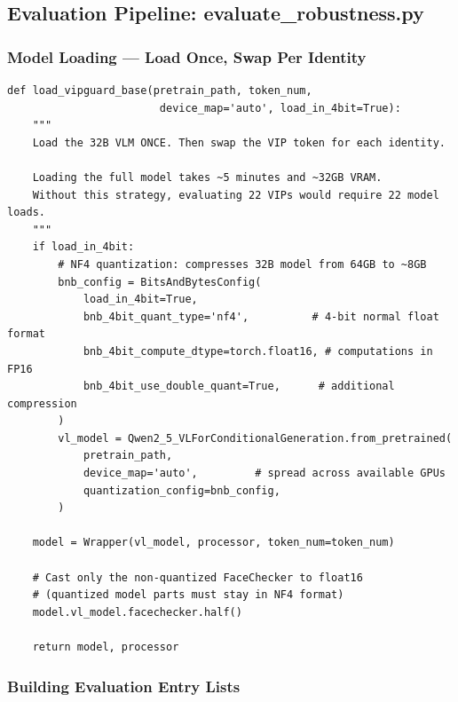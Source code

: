 \documentclass[12pt,a4paper]{article}
\begin{document}
\subsection{Evaluation Pipeline: evaluate\_robustness.py}

\subsubsection{Model Loading --- Load Once, Swap Per Identity}

\begin{lstlisting}[caption={evaluate\_robustness.py -- Efficient model loading strategy}]
def load_vipguard_base(pretrain_path, token_num,
                        device_map='auto', load_in_4bit=True):
    """
    Load the 32B VLM ONCE. Then swap the VIP token for each identity.

    Loading the full model takes ~5 minutes and ~32GB VRAM.
    Without this strategy, evaluating 22 VIPs would require 22 model loads.
    """
    if load_in_4bit:
        # NF4 quantization: compresses 32B model from 64GB to ~8GB
        bnb_config = BitsAndBytesConfig(
            load_in_4bit=True,
            bnb_4bit_quant_type='nf4',          # 4-bit normal float format
            bnb_4bit_compute_dtype=torch.float16, # computations in FP16
            bnb_4bit_use_double_quant=True,      # additional compression
        )
        vl_model = Qwen2_5_VLForConditionalGeneration.from_pretrained(
            pretrain_path,
            device_map='auto',         # spread across available GPUs
            quantization_config=bnb_config,
        )

    model = Wrapper(vl_model, processor, token_num=token_num)

    # Cast only the non-quantized FaceChecker to float16
    # (quantized model parts must stay in NF4 format)
    model.vl_model.facechecker.half()

    return model, processor
\end{lstlisting}

\subsubsection{Building Evaluation Entry Lists}
\end{document}

